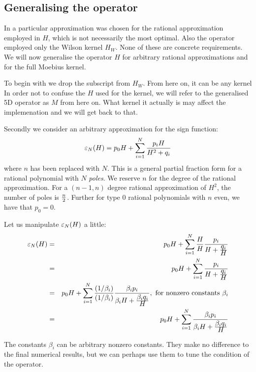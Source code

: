 \documentclass[12pt]{article}
\begin{document}
\subsection{Generalising the operator}
In \cite{NeubergerNarayanan} a particular approximation was chosen for the 
rational approximation employed in $H$, which is not necessarily the 
most optimal. Also the operator employed only the Wilson kernel $H_W$. 
None of these are concrete requirements. We will now generalise 
the operator $H$ for arbitrary rational approximations and for the 
full Moebius kernel.

To begin with we drop the subscript from $H_W$. From here on, it can 
be any kernel In order not to confuse the $H$ used for the kernel, 
we will refer to the generalised 5D operator as $M$ from here on. 
What kernel it actually is may affect the implemenation
and we will get back to that.

Secondly we consider an arbitrary approximation for the sign function:
\begin{equation}
\varepsilon_{N}(H) = p_0 H + \sum_{i=1}^{N} \frac{ p_i H }{H^2 + q_i}
\end{equation}
where $n$ has been replaced with $N$. This is a general partial fraction
form for a rational polynomial with $N$ {\em poles}. We reserve $n$ for the
degree of the rational approximation. For a $(n-1, n)$ degree
rational approximation of $H^2$, the number of poles is $ n \over 2$. Further
for type 0 rational polynomials with $n$ even, we have that $p_0=0$.

Let us manipulate $\varepsilon_{N}(H)$ a little:
\begin{eqnarray} 
\varepsilon_{N}(H) &=& p_0 H + \sum_{i=1}^{N} \frac{H}{H} \frac{p_i}{H + \frac{\displaystyle q_i}{\displaystyle H}} \\
            &=& p_0 H + \sum_{i=1}^{N} \frac{p_i}{H + \frac{\displaystyle q_i}{\displaystyle H}} \\
            &=& p_0 H + \sum_{i=1}^{N} \frac{(1/\beta_i)}{(1/\beta_i)} \frac{ \beta_i p_i}{\beta_i H + \frac{\displaystyle \beta_i q_i}{\displaystyle H}}, \ \mbox{for nonzero constants}\  \beta_i  \\
 &=& p_0 H + \sum_{i=1}^{N} \frac{ \beta_i p_i}{\beta_i H + \frac{\displaystyle \beta_i q_i}{\displaystyle H}}
\end{eqnarray}

The constants $\beta_i$ can be arbitrary nonzero constants. They make no
difference to the final numerical results, but we can perhaps use them 
to tune the condition of the operator.
\end{document}
